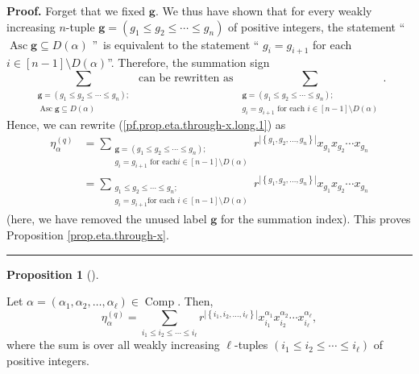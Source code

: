 \documentclass[numbers=enddot,12pt,final,onecolumn,notitlepage]{scrartcl}%
\theoremstyle{definition}
\newtheorem{prop}[theo]{Proposition}
\newenvironment{proposition}[1][]
{\begin{prop}[#1]\begin{leftbar}}
{\end{leftbar}\end{prop}}
\newenvironment{proof}[1][Proof]{\noindent\textbf{#1.} }{\ \rule{0.5em}{0.5em}}
\let\sumnonlimits\sum
\renewcommand{\sum}{\sumnonlimits\limits}
\newenvironment{verlong}{}{}
\begin{document}
\begin{verlong}
\begin{proof}
Forget that we fixed $\mathbf{g}$. We thus have shown that for every weakly
increasing $n$-tuple $\mathbf{g}=\left(  g_{1}\leq g_{2}\leq\cdots\leq
g_{n}\right)  $ of positive integers, the statement \textquotedblleft%
$\operatorname*{Asc}\mathbf{g}\subseteq D\left(  \alpha\right)  $%
\textquotedblright\ is equivalent to the statement \textquotedblleft%
$g_{i}=g_{i+1}$ for each $i\in\left[  n-1\right]  \setminus D\left(
\alpha\right)  $\textquotedblright. Therefore, the summation sign%
\[
\sum_{\substack{\mathbf{g}=\left(  g_{1}\leq g_{2}\leq\cdots\leq g_{n}\right)
;\\\operatorname*{Asc}\mathbf{g}\subseteq D\left(  \alpha\right)  }}\text{ can
be rewritten as }\sum_{\substack{\mathbf{g}=\left(  g_{1}\leq g_{2}\leq
\cdots\leq g_{n}\right)  ;\\g_{i}=g_{i+1}\text{ for each }i\in\left[
n-1\right]  \setminus D\left(  \alpha\right)  }}\text{.}%
\]
Hence, we can rewrite (\ref{pf.prop.eta.through-x.long.1}) as%
\begin{align*}
\eta_{\alpha}^{\left(  q\right)  }  &  =\sum_{\substack{\mathbf{g}=\left(
g_{1}\leq g_{2}\leq\cdots\leq g_{n}\right)  ;\\g_{i}=g_{i+1}\text{ for each
}i\in\left[  n-1\right]  \setminus D\left(  \alpha\right)  }}r^{\left\vert
\left\{  g_{1},g_{2},\ldots,g_{n}\right\}  \right\vert }x_{g_{1}}x_{g_{2}%
}\cdots x_{g_{n}}\\
&  =\sum_{\substack{g_{1}\leq g_{2}\leq\cdots\leq g_{n};\\g_{i}=g_{i+1}\text{
for each }i\in\left[  n-1\right]  \setminus D\left(  \alpha\right)
}}r^{\left\vert \left\{  g_{1},g_{2},\ldots,g_{n}\right\}  \right\vert
}x_{g_{1}}x_{g_{2}}\cdots x_{g_{n}}%
\end{align*}
(here, we have removed the unused label $\mathbf{g}$ for the summation index).
This proves Proposition \ref{prop.eta.through-x}.
\end{proof}
\end{verlong}

\begin{proposition}
\label{prop.eta.through-x2}Let $\alpha=\left(  \alpha_{1},\alpha_{2}%
,\ldots,\alpha_{\ell}\right)  \in\operatorname*{Comp}$. Then,%
\begin{equation}
\eta_{\alpha}^{\left(  q\right)  }=\sum_{i_{1}\leq i_{2}\leq\cdots\leq
i_{\ell}}r^{\left\vert \left\{  i_{1},i_{2},\ldots,i_{\ell}\right\}
\right\vert }x_{i_{1}}^{\alpha_{1}}x_{i_{2}}^{\alpha_{2}}\cdots x_{i_{\ell}%
}^{\alpha_{\ell}}, \label{eq.prop.eta.through-x2.eq}%
\end{equation}
where the sum is over all weakly increasing $\ell$-tuples $\left(  i_{1}\leq
i_{2}\leq\cdots\leq i_{\ell}\right)  $ of positive integers.
\end{proposition}
\end{document}
